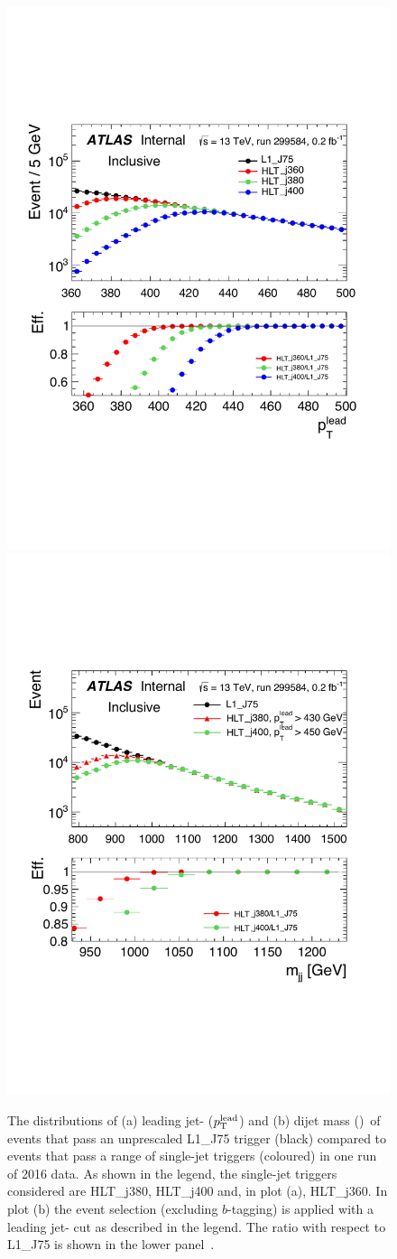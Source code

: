 \begin{figure}[!b]
  \begin{center}
    \captionsetup[subfigure]{aboveskip=0pt,justification=centering}
    \hspace{-2mm}
     {\includegraphics[width=0.47\linewidth, angle=0]{figs/Dibjet/ICHEP/evt-jet_pt.pdf}}
    \subcaptionbox{\mjj}              {\includegraphics[width=0.46\linewidth, angle=0]{figs/Dibjet/ICHEP/evt-mjj.pdf}}
  \end{center}
  \vspace{-1em}
  \caption[Derivations of the leading jet-\pT{} and \mjj{} cuts for the \summer{} data-set event selection using events that pass an
            unprescaled L1\_J75 trigger compared to events that pass a range of single-jet triggers in one run of 2016 data.]
          {The distributions of (a) leading jet-\pT{} ($p_{\mathrm{T}}^{\text{lead}}$) and (b) dijet mass (\mjj{})~of events that pass an
            unprescaled L1\_J75 trigger (black) compared to events that pass a range of single-jet triggers (coloured) in one run of 2016 data.
            As shown in the legend, the single-jet triggers considered are HLT\_j380, HLT\_j400 and, in plot (a), HLT\_j360.
            In plot (b) the \summer{} event selection (excluding $b$-tagging) is applied with a leading jet-\pT{} cut as described in the legend.
            The ratio with respect to L1\_J75 is shown in the lower panel~\cite{dibjet-ichep_conf}.}
     \label{fig:evt-ICHEP_turnon}
\end{figure}


